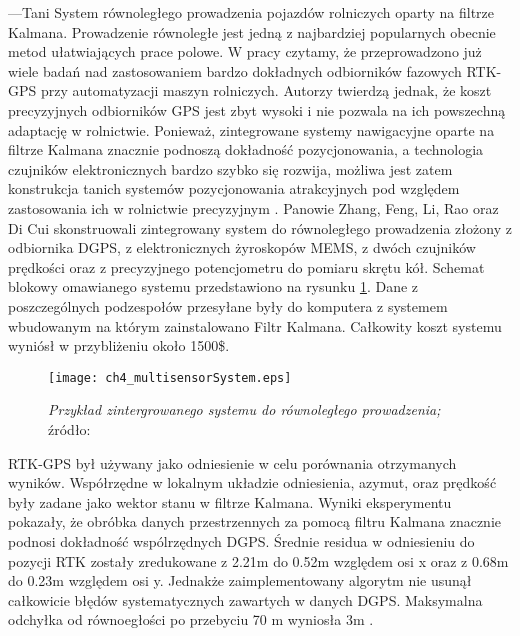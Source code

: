 ---Tani System równoległego prowadzenia pojazdów rolniczych oparty na filtrze Kalmana.
Prowadzenie równoległe jest jedną z najbardziej popularnych obecnie metod ułatwiających prace polowe.
W pracy \cite{CCTA5_461_469} czytamy, że przeprowadzono już wiele badań nad zastosowaniem bardzo dokładnych odbiorników fazowych RTK-GPS
przy automatyzacji maszyn rolniczych. Autorzy twierdzą jednak, że koszt precyzyjnych odbiorników GPS jest zbyt wysoki
i nie pozwala na ich powszechną adaptację w rolnictwie. Ponieważ, zintegrowane systemy nawigacyjne oparte na filtrze Kalmana
znacznie podnoszą dokładność pozycjonowania, a technologia czujników elektronicznych bardzo szybko się rozwija,
możliwa jest zatem konstrukcja tanich systemów pozycjonowania atrakcyjnych pod względem zastosowania ich w rolnictwie precyzyjnym \cite{CCTA5_461_469}.
Panowie Zhang, Feng, Li, Rao oraz Di Cui skonstruowali zintegrowany system do równoległego prowadzenia złożony z odbiornika DGPS,
z elektronicznych żyroskopów MEMS, z dwóch czujników prędkości oraz z precyzyjnego potencjometru do pomiaru skrętu kół.
Schemat blokowy omawianego systemu przedstawiono na rysunku \ref{fig:ch4_multisensorSystem}.
Dane z poszczególnych podzespołów przesyłane były do komputera z systemem wbudowanym na którym zainstalowano Filtr Kalmana.
Całkowity koszt systemu wyniósł w przybliżeniu około 1500\$.
\begin{figure}[H]
\centering
\texttt{[image: ch4\_multisensorSystem.eps]}
\caption{\textit{Przykład zintergrowanego systemu do równoległego prowadzenia;} 
źródło: \cite[][strona 464]{CCTA5_461_469}}
\label{fig:ch4_multisensorSystem}
\end{figure}   
RTK-GPS był używany jako odniesienie w celu porównania otrzymanych wyników. 
Współrzędne w lokalnym układzie odniesienia, azymut, oraz prędkość były zadane jako wektor stanu w filtrze Kalmana.
Wyniki eksperymentu pokazały, że obróbka danych przestrzennych za pomocą filtru Kalmana znacznie podnosi dokładność wspólrzędnych DGPS.
Średnie residua w odniesieniu do pozycji RTK zostały zredukowane z 2.21m do 0.52m względem osi x oraz z 0.68m do 0.23m względem osi y.
Jednakże zaimplementowany algorytm nie usunął całkowicie błędów systematycznych zawartych w danych DGPS.
Maksymalna odchyłka od równoegłości po przebyciu 70 m wyniosła 3m \cite{CCTA5_461_469}.


